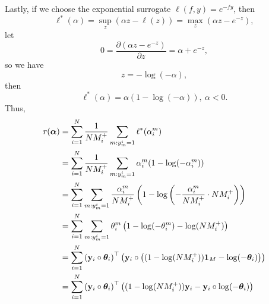 Lastly, if we choose the exponential surrogate $\ell(f, y) = e^{-fy}$, then
\begin{equation*}
\ell^*(\alpha) = \sup_z \left(\alpha z - \ell(z) \right) = \max_z \left(\alpha z - e^{-z} \right),
\end{equation*}
let 
\begin{equation*}
0 = \frac{\partial (\alpha z - e^{-z})}{\partial z} = \alpha + e^{-z},
\end{equation*}
so we have
\begin{equation*}
z = -\log(-\alpha),
\end{equation*}
then
\begin{equation*}
\ell^*(\alpha) = \alpha ( 1 - \log(-\alpha) ), \ \alpha < 0.
\end{equation*}
Thus,
\begin{equation}
\label{eq:expconj}
\begin{aligned}
r({\bm{\alpha}})
&= \sum_{i=1}^N \frac{1}{N M_i^+} \sum_{m: y_m^i = 1} \ell^*(\alpha_i^m) \\
&= \sum_{i=1}^N \frac{1}{N M_i^+} \sum_{m: y_m^i = 1} \alpha_i^m (1 - \log(-\alpha_i^m)) \\
&= \sum_{i=1}^N \sum_{m: y_m^i = 1} \frac{\alpha_i^m}{N M_i^+} \left(1 - \log \left( -\frac{\alpha_i^m}{N M_i^+} \cdot N M_i^+ \right) \right) \\
&= \sum_{i=1}^N \sum_{m: y_m^i = 1} \theta_i^m \left(1 - \log(-\theta_i^m) - \log(N M_i^+) \right) \\
&= \sum_{i=1}^N \left( \mathbf{y}_i \circ \bm{\theta}_i \right)^\top 
                \left( \mathbf{y}_i \circ \left( (1 - \log(N M_i^+)) \mathbf{1}_M - \log(-\bm{\theta}_i) \right) \right) \\
&= \sum_{i=1}^N \left( \mathbf{y}_i \circ \bm{\theta}_i \right)^\top 
                \left( (1 - \log(N M_i^+)) \mathbf{y}_i - \mathbf{y}_i \circ \log(-\bm{\theta}_i) \right)
\end{aligned}
\end{equation}

